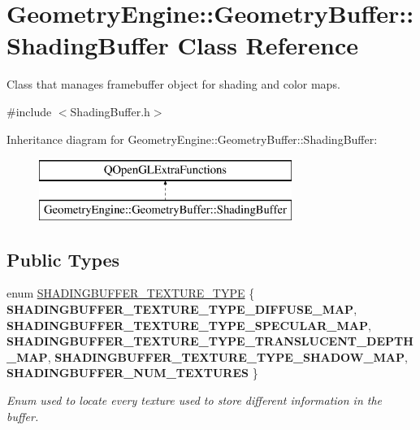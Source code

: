 \hypertarget{class_geometry_engine_1_1_geometry_buffer_1_1_shading_buffer}{}\section{Geometry\+Engine\+::Geometry\+Buffer\+::Shading\+Buffer Class Reference}
\label{class_geometry_engine_1_1_geometry_buffer_1_1_shading_buffer}


Class that manages framebuffer object for shading and color maps.  




{\ttfamily \#include $<$Shading\+Buffer.\+h$>$}

Inheritance diagram for Geometry\+Engine\+::Geometry\+Buffer\+::Shading\+Buffer\+:\begin{figure}[H]
\begin{center}
\leavevmode
\includegraphics[height=2.000000cm]{class_geometry_engine_1_1_geometry_buffer_1_1_shading_buffer}
\end{center}
\end{figure}
\subsection*{Public Types}
\begin{DoxyCompactItemize}
\item 
\mbox{\label{class_geometry_engine_1_1_geometry_buffer_1_1_shading_buffer_a8047a079ff9fb9fa3400651664c92ae9}} 
enum \mbox{\hyperlink{class_geometry_engine_1_1_geometry_buffer_1_1_shading_buffer_a8047a079ff9fb9fa3400651664c92ae9}{S\+H\+A\+D\+I\+N\+G\+B\+U\+F\+F\+E\+R\+\_\+\+T\+E\+X\+T\+U\+R\+E\+\_\+\+T\+Y\+PE}} \{ \newline
{\bfseries S\+H\+A\+D\+I\+N\+G\+B\+U\+F\+F\+E\+R\+\_\+\+T\+E\+X\+T\+U\+R\+E\+\_\+\+T\+Y\+P\+E\+\_\+\+D\+I\+F\+F\+U\+S\+E\+\_\+\+M\+AP}, 
{\bfseries S\+H\+A\+D\+I\+N\+G\+B\+U\+F\+F\+E\+R\+\_\+\+T\+E\+X\+T\+U\+R\+E\+\_\+\+T\+Y\+P\+E\+\_\+\+S\+P\+E\+C\+U\+L\+A\+R\+\_\+\+M\+AP}, 
{\bfseries S\+H\+A\+D\+I\+N\+G\+B\+U\+F\+F\+E\+R\+\_\+\+T\+E\+X\+T\+U\+R\+E\+\_\+\+T\+Y\+P\+E\+\_\+\+T\+R\+A\+N\+S\+L\+U\+C\+E\+N\+T\+\_\+\+D\+E\+P\+T\+H\+\_\+\+M\+AP}, 
{\bfseries S\+H\+A\+D\+I\+N\+G\+B\+U\+F\+F\+E\+R\+\_\+\+T\+E\+X\+T\+U\+R\+E\+\_\+\+T\+Y\+P\+E\+\_\+\+S\+H\+A\+D\+O\+W\+\_\+\+M\+AP}, 
\newline
{\bfseries S\+H\+A\+D\+I\+N\+G\+B\+U\+F\+F\+E\+R\+\_\+\+N\+U\+M\+\_\+\+T\+E\+X\+T\+U\+R\+ES}
 \}
\begin{DoxyCompactList}\small\item\em Enum used to locate every texture used to store different information in the buffer. \end{DoxyCompactList}\end{DoxyCompactItemize}
